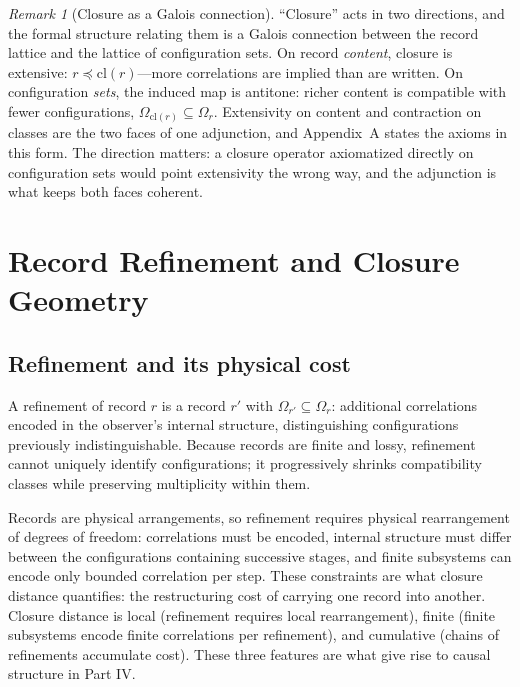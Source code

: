 \documentclass[11pt]{article}
\theoremstyle{definition}
\theoremstyle{remark}
\newtheorem{remark}{Remark}
\begin{document}
\begin{remark}[Closure as a Galois connection]\label{rem:galois}
``Closure'' acts in two directions, and the formal structure relating them is a Galois connection between the record lattice and the lattice of configuration sets. On record \emph{content}, closure is extensive: $r \preceq \mathrm{cl}(r)$---more correlations are implied than are written. On configuration \emph{sets}, the induced map is antitone: richer content is compatible with fewer configurations, $\Omega_{\mathrm{cl}(r)} \subseteq \Omega_r$. Extensivity on content and contraction on classes are the two faces of one adjunction, and Appendix~A states the axioms in this form. The direction matters: a closure operator axiomatized directly on configuration sets would point extensivity the wrong way, and the adjunction is what keeps both faces coherent.
\end{remark}

\section{Record Refinement and Closure Geometry}\label{sec:geometry}

\subsection{Refinement and its physical cost}
A refinement of record $r$ is a record $r'$ with $\Omega_{r'} \subseteq \Omega_r$: additional correlations encoded in the observer's internal structure, distinguishing configurations previously indistinguishable. Because records are finite and lossy, refinement cannot uniquely identify configurations; it progressively shrinks compatibility classes while preserving multiplicity within them.

Records are physical arrangements, so refinement requires physical rearrangement of degrees of freedom: correlations must be encoded, internal structure must differ between the configurations containing successive stages, and finite subsystems can encode only bounded correlation per step. These constraints are what closure distance quantifies: the restructuring cost of carrying one record into another. Closure distance is local (refinement requires local rearrangement), finite (finite subsystems encode finite correlations per refinement), and cumulative (chains of refinements accumulate cost). These three features are what give rise to causal structure in Part IV.
\end{document}
